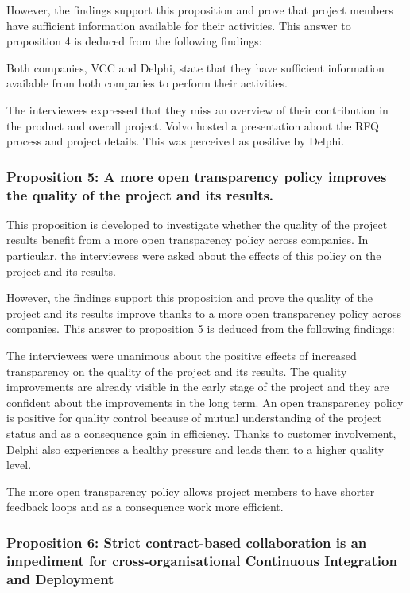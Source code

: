 However, the findings support this proposition and prove that project members have sufficient information available for their activities. This answer to proposition 4 is deduced from the following findings:

 Both companies, VCC and Delphi, state that they have sufficient information available from both companies to perform their activities. 

 The interviewees expressed that they miss an overview of their contribution in the product and overall project. Volvo hosted a presentation about the RFQ process and project details. This was perceived as positive by Delphi.


\subsubsection{Proposition 5: A more open transparency policy improves the quality of the project and its results.}

This proposition is developed to investigate whether the quality of the project results benefit from a more open transparency policy across companies. In particular, the interviewees were asked about the effects of this policy on the project and its results.

However, the findings support this proposition and prove the quality of the project and its results improve thanks to a more open transparency policy across companies. This answer to proposition 5 is deduced from the following findings:

 The interviewees were unanimous about the positive effects of increased transparency on the quality of the project and its results. The quality improvements are already visible in the early stage of the project and they are confident about the improvements in the long term. An open transparency policy is positive for quality control because of mutual understanding of the project status and as a consequence gain in efficiency. Thanks to customer involvement, Delphi also experiences a healthy pressure and leads them to a higher quality level.

 The more open transparency policy allows project members to have shorter feedback loops and as a consequence work more efficient.

\subsubsection{Proposition 6: Strict contract-based collaboration is an impediment for cross-organisational Continuous Integration and Deployment}

